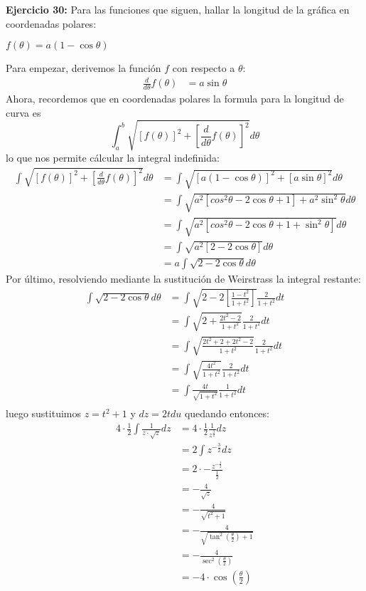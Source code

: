 \documentclass[../main.tex]{subfiles}
\begin{document}
    \question \textbf{Ejercicio 30:} Para las funciones que siguen, hallar la longitud de la gráfica en coordenadas polares:
    \begin{partes}
        \parte $f(\theta) = a(1-\cos \theta)$
    \end{partes}
    Para empezar, derivemos la función $f$ con respecto a $\theta$:
    \begin{align*}
        \frac{d}{d\theta} f(\theta) &= a\sin \theta
    \end{align*}
    Ahora, recordemos que en coordenadas polares la formula para la longitud de curva es $$\int_{a}^b \sqrt{\left[f(\theta)\right]^2+\left[\frac{d}{d\theta} f(\theta)\right]^2} d\theta$$ lo que nos permite cálcular la integral indefinida:
    \begin{align*}
        \int \sqrt{\left[f(\theta)\right]^2+\left[\frac{d}{d\theta} f(\theta)\right]^2} d\theta &= \int \sqrt{\left[a(1-\cos\theta)\right]^2+\left[a\sin\theta\right]^2} d\theta\\
        &= \int \sqrt{a^2\left[cos^2\theta - 2\cos\theta + 1\right] + a^2\sin^2\theta} d\theta\\
        &= \int \sqrt{a^2\left[cos^2\theta - 2\cos\theta + 1 + \sin^2\theta\right]} d\theta\\
        &= \int \sqrt{a^2\left[2-2\cos\theta\right]} d\theta\\
        &= a \int \sqrt{2-2\cos\theta} d\theta
    \end{align*}
    Por último, resolviendo mediante la sustitución de Weirstrass la integral restante:
    \begin{align*}
        \int \sqrt{2-2\cos\theta} d\theta &= \int \sqrt{2-2\left[\frac{1-t^2}{1+t^2}\right]} \frac{2}{1+t^2} dt\\
        &= \int \sqrt{2+\frac{2t^2-2}{1+t^2}}\frac{2}{1+t^2} dt\\
        &= \int \sqrt{\frac{2t^2+ 2+ 2t^2-2}{1+t^2}}\frac{2}{1+t^2} dt\\
        &= \int \sqrt{\frac{4t^2}{1+t^2}}\frac{2}{1+t^2} dt\\
        &= \int \frac{4t}{\sqrt{1+t^2}}\frac{1}{1+t^2} dt\\
    \end{align*}
    luego sustituimos $z = t^2+1$ y $dz = 2t du$ quedando entonces:
    \begin{align*}
        4 \cdot \frac{1}{2}\int \frac{1}{z \cdot \sqrt{z}} dz &= 4 \cdot \frac{1}{2}\frac{1}{z^{\frac{3}{2}}} dz\\
        &= 2 \int z^{-\frac{3}{2}} dz \\
        &= 2 \cdot -\frac{z^{-\frac{1}{2}}}{\frac{1}{2}}\\
        &= -\frac{4}{\sqrt{z}}\\
        &= -\frac{4}{\sqrt{t^2+1}}\\
        &= -\frac{4}{\sqrt{\tan^2(\frac{\theta}{2}) + 1}}\\
        &= -\frac{4}{\sec^2\left(\frac{\theta}{2}\right)}\\
        &= -4 \cdot \cos\left(\frac{\theta}{2}\right)
    \end{align*} 
\end{document}
